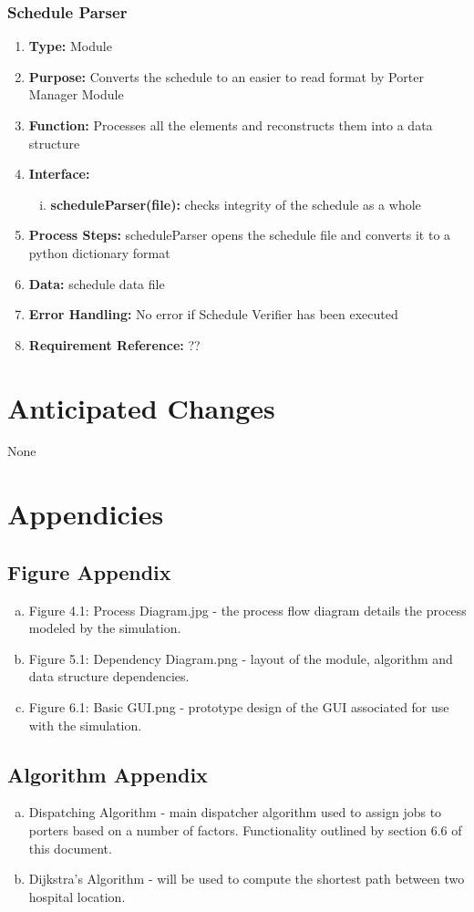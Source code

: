 \documentclass[paper=letter, fontsize=10pt]{scrartcl}
\numberwithin{equation}{section}		%
\numberwithin{figure}{section}			%
\numberwithin{table}{section}				%
\begin{document}
\subsubsection{Schedule Parser}
\begin{enumerate}[]
	\item \textbf{Type:} Module
	\item \textbf{Purpose:} Converts the schedule to an easier to read format by Porter Manager Module
	\item \textbf{Function:} Processes all the elements and reconstructs them into a data structure
	\item \textbf{Interface:} 
	\begin{enumerate}[(i)]
		\item \textbf{scheduleParser(file):} checks integrity of the schedule as a whole
	\end{enumerate}
	\item \textbf{Process Steps:} scheduleParser opens the schedule file and converts it to a python dictionary format
	\item \textbf{Data:} schedule data file
	\item \textbf{Error Handling:} No error if Schedule Verifier has been executed
	\item \textbf{Requirement Reference:} ??
\end{enumerate}

\section{Anticipated Changes}
None

\section{Appendicies}
\subsection{Figure Appendix}
\begin{enumerate}[(a)]
	\item Figure 4.1: Process Diagram.jpg - the process flow diagram details the process modeled by the simulation.
	\item Figure 5.1: Dependency Diagram.png - layout of the module, algorithm and data structure dependencies.
	\item Figure 6.1: Basic GUI.png - prototype design of the GUI associated for use with the simulation.
\end{enumerate}
\subsection{Algorithm Appendix}
\begin{enumerate}[(a)]
	\item Dispatching Algorithm - main dispatcher algorithm used to assign jobs to porters based on a number of factors. Functionality outlined by section 6.6 of this document.
	\item Dijkstra's Algorithm - will be used to compute the shortest path between two hospital location.
\end{enumerate}

\end{document}
